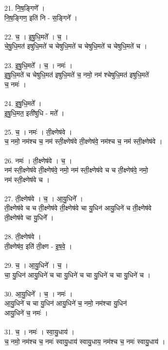 21. नि॒ष॒ङ्गिणे᳚ ।\\
नि॒ष॒ङ्गिण॒ इति॑ नि - स॒ङ्गिने᳚ ।\\
\\
22. च॒ । इ॒षु॒धि॒मते᳚ । च॒ ।\\
चे॒षु॒धि॒मत॑ इषुधि॒मते॑ च चेषुधि॒मते॑ च चेषुधि॒मते॑ च चेषुधि॒मते॑ च ।\\
\\
23. इ॒षु॒धि॒मते᳚ । च॒ । नमः॑ ।\\
इ॒षु॒धि॒मते॑ च चेषुधि॒मत॑ इषुधि॒मते॑ च॒ नमो॒ नम॑ श्चेषुधि॒मत॑ इषुधि॒मते॑\\
च॒ नमः॑ ।\\
\\
24. इ॒षु॒धि॒मते᳚ ।\\
इ॒षु॒धि॒मत॒ इती॑षुधि - मते᳚ ।\\
\\
25. च॒ । नमः॑ । ती॒क्ष्णेष॑वे ।\\
च॒ नमो॒ नम॑श्च च॒ नम॑ स्ती॒क्ष्णेष॑वे ती॒क्ष्णेष॑वे॒ नम॑श्च च॒ नम॑ स्ती॒क्ष्णेष॑वे ।\\
\\
26. नमः॑ । ती॒क्ष्णेष॑वे । च॒ ।\\
नम॑ स्ती॒क्ष्णेष॑वे ती॒क्ष्णेष॑वे॒ नमो॒ नम॑ स्ती॒क्ष्णेष॑वे च च ती॒क्ष्णेष॑वे॒ नमो॒\\
नम॑ स्ती॒क्ष्णेष॑वे च ।\\
\\
27. ती॒क्ष्णेष॑वे । च॒ । आ॒यु॒धिने᳚ ।\\
ती॒क्ष्णेष॑वे च च ती॒क्ष्णेष॑वे ती॒क्ष्णेष॑वे चा यु॒धिन॑ आयु॒धिने॑ च ती॒क्ष्णेष॑वे\\
ती॒क्ष्णेष॑वे चा यु॒धिने᳚ ।\\
\\
28. ती॒क्ष्णेष॑वे ।\\
ती॒क्ष्णेष॑व॒ इति॑ ती॒क्ष्ण - इ॒ष॒वे॒ ।\\
\\
29. च॒ । आ॒यु॒धिने᳚ । च॒ ।\\
चा॒ यु॒धिन॑ आयु॒धिने॑ च चा यु॒धिने॑ च चा यु॒धिने॑ च चा यु॒धिने॑ च ।\\
\\
30. आ॒यु॒धिने᳚ । च॒ । नमः॑ ।\\
आ॒यु॒धिने॑ च चा यु॒धिन॑ आयु॒धिने॑ च॒ नमो॒ नम॑श्चा यु॒धिन॑\\
आयु॒धिने॑ च॒ नमः॑ ।\\
\\
31. च॒ । नमः॑ । स्वा॒यु॒धाय॑ ।\\
च॒ नमो॒ नम॑श्च च॒ नमः॑ स्वायु॒धाय॑ स्वायु॒धाय॒ नम॑श्च च॒ नमः॑ स्वायु॒धाय॑ ।\\
